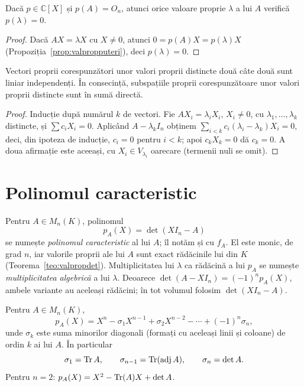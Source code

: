\begin{lema}\label{lema:valpropanulare}
Dacă $p\in\mathbb{C}[X]$ și $p(A)=O_n$, atunci orice valoare proprie $\lambda$ a lui $A$ verifică $p(\lambda)=0$.
\end{lema}

\begin{proof}
Dacă $AX=\lambda X$ cu $X\neq0$, atunci $0=p(A)X=p(\lambda)X$ (Propoziția~\ref{prop:valpropputeri}), deci $p(\lambda)=0$.
\end{proof}

\begin{propozitie}\label{prop:vectpropindependenti}
Vectori proprii corespunzători unor valori proprii distincte două câte două sunt liniar independenți. În consecință, subspațiile proprii corespunzătoare unor valori proprii distincte sunt în sumă directă.
\end{propozitie}

\begin{proof}
Inducție după numărul $k$ de vectori. Fie $AX_i=\lambda_iX_i$, $X_i\neq0$, cu $\lambda_1,\dots,\lambda_k$ distincte, și $\sum c_iX_i=0$. Aplicând $A-\lambda_kI_n$ obținem $\sum_{i<k}c_i(\lambda_i-\lambda_k)X_i=0$, deci, din ipoteza de inducție, $c_i=0$ pentru $i<k$; apoi $c_kX_k=0$ dă $c_k=0$. A doua afirmație este aceeași, cu $X_i\in V_{\lambda_i}$ oarecare (termenii nuli se omit).
\end{proof}

\section{Polinomul caracteristic}

\begin{definitie}
Pentru $A\in M_n(K)$, polinomul
\[
p_A(X)=\det(XI_n-A)
\]
se numește \emph{polinomul caracteristic} al lui $A$; îl notăm și cu $f_A$. El este monic, de grad $n$, iar valorile proprii ale lui $A$ sunt exact rădăcinile lui din $K$ (Teorema~\ref{teo:valpropdet}). Multiplicitatea lui $\lambda$ ca rădăcină a lui $p_A$ se numește \emph{multiplicitatea algebrică} a lui $\lambda$. Deoarece $\det(A-XI_n)=(-1)^np_A(X)$, ambele variante au aceleași rădăcini; în tot volumul folosim $\det(XI_n-A)$.
\end{definitie}

\begin{propozitie}\label{prop:coefpolcar}
Pentru $A\in M_n(K)$,
\[
p_A(X)=X^n-\sigma_1X^{n-1}+\sigma_2X^{n-2}-\cdots+(-1)^n\sigma_n,
\]
unde $\sigma_k$ este suma minorilor diagonali (formați cu aceleași linii și coloane) de ordin $k$ ai lui $A$. În particular
\[
\sigma_1=\operatorname{Tr} A,\qquad\sigma_{n-1}=\operatorname{Tr}(\operatorname{adj} A),\qquad\sigma_n=\det A .
\]
Pentru $n=2$: $p_A(X)=X^2-\operatorname{Tr}(A)X+\det A$.
\end{propozitie}


